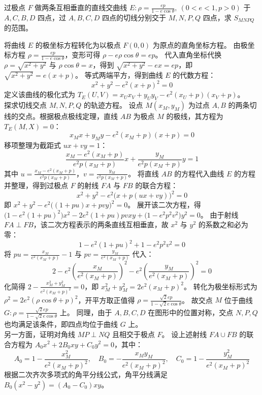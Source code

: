 \begin{exercise}
过极点 \(F\) 做两条互相垂直的直线交曲线 \(E: \rho = \frac{ep}{1-e\cos\theta},\ (0<e<1,p>0)\) 于 \(A,C,B,D\) 四点，过 \(A,B,C,D\) 四点的切线分别交于 \(M,N,P,Q\) 四点，求 \(S_{MNPQ}\) 的范围。
\end{exercise}
\begin{solution}
将曲线 $E$ 的极坐标方程转化为以极点 $F(0,0)$ 为原点的直角坐标方程。
由极坐标方程 $\rho = \frac{ep}{1-e\cos\theta}$，变形可得 $\rho - e\rho\cos\theta = ep$。
代入直角坐标代换 $\rho = \sqrt{x^2+y^2}$ 与 $\rho\cos\theta = x$，得到 $\sqrt{x^2+y^2} - ex = ep$，即 $\sqrt{x^2+y^2} = e(x+p)$。
等式两端平方，得到曲线 $E$ 的代数方程：
$$ x^2 + y^2 - e^2(x+p)^2 = 0 $$
定义该曲线的极化式为 $T_E(U, V) = x_U x_V + y_U y_V - e^2(x_U+p)(x_V+p)$。\\
探求切线交点 $M, N, P, Q$ 的轨迹方程。
设点 $M(x_M, y_M)$ 为过点 $A, B$ 的两条切线的交点。根据极点极线定理，直线 $AB$ 为极点 $M$ 的极线，其方程为 $T_E(M, X) = 0$：
$$ x_M x + y_M y - e^2(x_M+p)(x+p) = 0 $$
移项整理为截距式 $ux + vy = 1$：
$$ \frac{x_M - e^2(x_M+p)}{e^2 p(x_M+p)} x + \frac{y_M}{e^2 p(x_M+p)} y = 1 $$
其中 $u = \frac{x_M - e^2(x_M+p)}{e^2 p(x_M+p)}$，$v = \frac{y_M}{e^2 p(x_M+p)}$。
将直线 $AB$ 的方程代入曲线 $E$ 的方程并整理，得到过极点 $F$ 的射线 $FA$ 与 $FB$ 的联合方程：
$$ x^2 + y^2 - e^2\big(x + p(ux + vy)\big)^2 = 0 $$
即 $x^2 + y^2 - e^2\big((1+pu)x + pvy\big)^2 = 0$。
展开该二次方程，得 $\big(1 - e^2(1+pu)^2\big)x^2 - 2e^2(1+pu)pv xy + \big(1 - e^2 p^2 v^2\big)y^2 = 0$。
由于射线 $FA \perp FB$，该二次方程表示的两条直线互相垂直，故 $x^2$ 与 $y^2$ 的系数之和必为零：
$$ 1 - e^2(1+pu)^2 + 1 - e^2 p^2 v^2 = 0 $$
将 $pu = \frac{x_M}{e^2(x_M+p)} - 1$ 与 $pv = \frac{y_M}{e^2(x_M+p)}$ 代入：
$$ 2 - e^2\left(\frac{x_M}{e^2(x_M+p)}\right)^2 - e^2\left(\frac{y_M}{e^2(x_M+p)}\right)^2 = 0 $$
化简得 $2 - \frac{x_M^2 + y_M^2}{e^2(x_M+p)^2} = 0$，即 $x_M^2 + y_M^2 = 2e^2(x_M+p)^2$。
转化为极坐标形式为 $\rho^2 = 2e^2(\rho\cos\theta + p)^2$，开平方取正值得 $\rho = \frac{\sqrt{2}ep}{1 - \sqrt{2}e\cos\theta}$。
故交点 $M$ 位于曲线 $G: \rho = \frac{\sqrt{2}ep}{1-\sqrt{2}e\cos\theta}$ 上。
同理，由于 $A, B, C, D$ 在图形中的位置对称，交点 $N, P, Q$ 也均满足该条件，即四点均位于曲线 $G$ 上。\\
另一方面，证明对角线 $MP \perp NQ$ 且相交于极点 $F$。
设上述射线 $FA \cup FB$ 的联合方程为 $A_0 x^2 + 2B_0 xy + C_0 y^2 = 0$，其中：
$$ A_0 = 1 - \frac{x_M^2}{e^2(x_M+p)^2}, \quad B_0 = -\frac{x_M y_M}{e^2(x_M+p)^2}, \quad C_0 = 1 - \frac{y_M^2}{e^2(x_M+p)^2} $$
根据二次齐次多项式的角平分线公式，角平分线满足 $B_0(x^2 - y^2) = (A_0 - C_0)xy$。

\end{solution}

